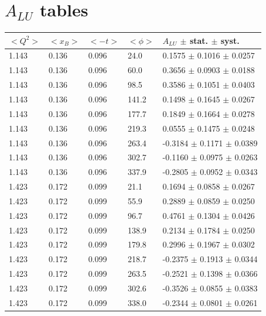 \chapter{$A_{LU}$ tables}
\begin{table}[!h]
   \begin{center}
      \begin{tabular}{||l|l|l|l|l||}
         \hline
 $<Q^{2}>$ & $<x_{B}>$ & $<-t>$ & $<\phi>$ & $A_{LU}$ $\pm$ stat. $\pm$ syst.\\
         \hline
  1.143 & 0.136 & 0.096 & 24.0  &  0.1575 $\pm$  0.1016 $\pm$ 0.0257 \\
  1.143 & 0.136 & 0.096 & 60.0  &  0.3656 $\pm$  0.0903 $\pm$ 0.0188 \\
  1.143 & 0.136 & 0.096 & 98.5  &  0.3586 $\pm$  0.1051 $\pm$ 0.0403 \\
  1.143 & 0.136 & 0.096 & 141.2 &  0.1498 $\pm$  0.1645 $\pm$ 0.0267 \\
  1.143 & 0.136 & 0.096 & 177.7 &  0.1849 $\pm$  0.1664 $\pm$ 0.0278 \\
  1.143 & 0.136 & 0.096 & 219.3 &  0.0555 $\pm$  0.1475 $\pm$ 0.0248 \\
  1.143 & 0.136 & 0.096 & 263.4 & -0.3184 $\pm$  0.1171 $\pm$ 0.0389 \\
  1.143 & 0.136 & 0.096 & 302.7 & -0.1160 $\pm$  0.0975 $\pm$ 0.0263 \\
  1.143 & 0.136 & 0.096 & 337.9 & -0.2805 $\pm$  0.0952 $\pm$ 0.0343 \\
  \hline                                                               
  1.423 & 0.172 & 0.099 & 21.1  &  0.1694 $\pm$  0.0858 $\pm$ 0.0267 \\
  1.423 & 0.172 & 0.099 & 55.9  &  0.2889 $\pm$  0.0859 $\pm$ 0.0250 \\
  1.423 & 0.172 & 0.099 & 96.7  &  0.4761 $\pm$  0.1304 $\pm$ 0.0426 \\
  1.423 & 0.172 & 0.099 & 138.9 &  0.2134 $\pm$  0.1784 $\pm$ 0.0250 \\
  1.423 & 0.172 & 0.099 & 179.8 &  0.2996 $\pm$  0.1967 $\pm$ 0.0302 \\
  1.423 & 0.172 & 0.099 & 218.7 & -0.2375 $\pm$  0.1913 $\pm$ 0.0344 \\
  1.423 & 0.172 & 0.099 & 263.5 & -0.2521 $\pm$  0.1398 $\pm$ 0.0366 \\
  1.423 & 0.172 & 0.099 & 302.6 & -0.3526 $\pm$  0.0855 $\pm$ 0.0383 \\
  1.423 & 0.172 & 0.099 & 338.0 & -0.2344 $\pm$  0.0801 $\pm$ 0.0261 \\

\end{tabular}
\end{center}
\end{table}
